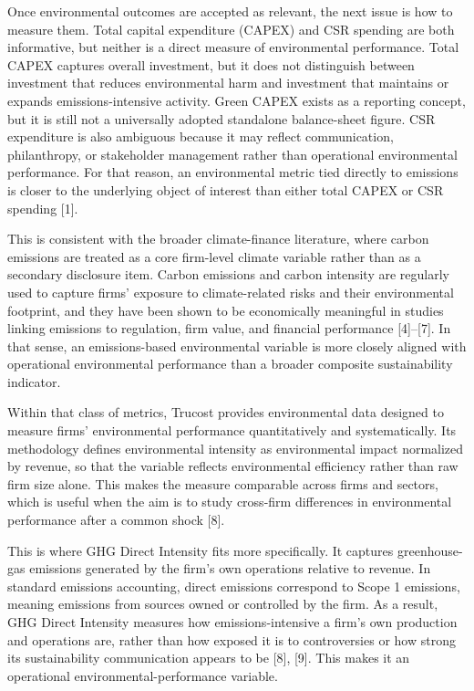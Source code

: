 \documentclass[12pt,a4paper]{article}
\begin{document}
Once environmental outcomes are accepted as relevant, the next issue is how to measure them. Total capital expenditure (CAPEX) and CSR spending are both informative, but neither is a direct measure of environmental performance. Total CAPEX captures overall investment, but it does not distinguish between investment that reduces environmental harm and investment that maintains or expands emissions-intensive activity. Green CAPEX exists as a reporting concept, but it is still not a universally adopted standalone balance-sheet figure. CSR expenditure is also ambiguous because it may reflect communication, philanthropy, or stakeholder management rather than operational environmental performance. For that reason, an environmental metric tied directly to emissions is closer to the underlying object of interest than either total CAPEX or CSR spending [1].

This is consistent with the broader climate-finance literature, where carbon emissions are treated as a core firm-level climate variable rather than as a secondary disclosure item. Carbon emissions and carbon intensity are regularly used to capture firms’ exposure to climate-related risks and their environmental footprint, and they have been shown to be economically meaningful in studies linking emissions to regulation, firm value, and financial performance [4]–[7]. In that sense, an emissions-based environmental variable is more closely aligned with operational environmental performance than a broader composite sustainability indicator.

Within that class of metrics, Trucost provides environmental data designed to measure firms’ environmental performance quantitatively and systematically. Its methodology defines environmental intensity as environmental impact normalized by revenue, so that the variable reflects environmental efficiency rather than raw firm size alone. This makes the measure comparable across firms and sectors, which is useful when the aim is to study cross-firm differences in environmental performance after a common shock [8].

This is where GHG Direct Intensity fits more specifically. It captures greenhouse-gas emissions generated by the firm’s own operations relative to revenue. In standard emissions accounting, direct emissions correspond to Scope 1 emissions, meaning emissions from sources owned or controlled by the firm. As a result, GHG Direct Intensity measures how emissions-intensive a firm’s own production and operations are, rather than how exposed it is to controversies or how strong its sustainability communication appears to be [8], [9]. This makes it an operational environmental-performance variable.
\end{document}
